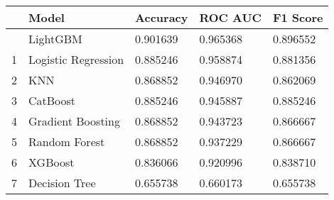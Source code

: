 \documentclass[
  letterpaper,
  DIV=11,
  numbers=noendperiod]{scrreprt}
\begin{document}
\begin{longtable}[]{@{}lllll@{}}
\toprule\noalign{}
& Model & Accuracy & ROC AUC & F1 Score \\
\midrule\noalign{}
\endhead
\bottomrule\noalign{}
\endlastfoot
0 & LightGBM & 0.901639 & 0.965368 & 0.896552 \\
1 & Logistic Regression & 0.885246 & 0.958874 & 0.881356 \\
2 & KNN & 0.868852 & 0.946970 & 0.862069 \\
3 & CatBoost & 0.885246 & 0.945887 & 0.885246 \\
4 & Gradient Boosting & 0.868852 & 0.943723 & 0.866667 \\
5 & Random Forest & 0.868852 & 0.937229 & 0.866667 \\
6 & XGBoost & 0.836066 & 0.920996 & 0.838710 \\
7 & Decision Tree & 0.655738 & 0.660173 & 0.655738 \\
\end{longtable}
\end{document}
